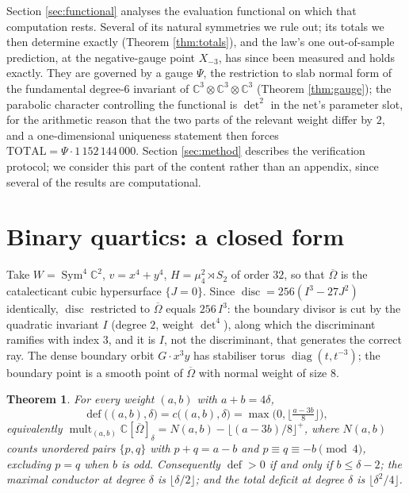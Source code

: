 \documentclass[11pt,reqno]{amsart}
\theoremstyle{plain}
\newtheorem{theorem}{Theorem}[section]
\theoremstyle{definition}
\DeclareMathOperator{\Sym}{Sym}
\DeclareMathOperator{\mult}{mult}
\DeclareMathOperator{\dfc}{def}
\newcommand{\cO}{\overline{\Omega}}
\newcommand{\bC}{\mathbb{C}}
\begin{document}
Section \ref{sec:functional} analyses the evaluation functional on which that
computation rests.  Several of its natural symmetries we rule out; its totals
we then determine exactly (Theorem \ref{thm:totals}), and the law's one
out-of-sample prediction, at the negative-gauge point $X_{-3}$, has since been
measured and holds exactly.  They are governed by a
gauge $\Psi$, the restriction to slab normal form of the fundamental degree-$6$
invariant of $\bC^{3}\otimes\bC^{3}\otimes\bC^{3}$ (Theorem \ref{thm:gauge});
the parabolic character controlling the functional is $\det^{2}$ in the net's
parameter slot, for the arithmetic reason that the two parts of the relevant
weight differ by $2$, and a one-dimensional uniqueness statement then forces
$\mathrm{TOTAL}=\Psi\cdot 1\,152\,144\,000$.  Section \ref{sec:method}
describes the verification protocol; we consider this part of the content
rather than an appendix, since several of the results are computational.

\section{Binary quartics: a closed form}\label{sec:worldA}

Take $W=\Sym^{4}\bC^{2}$, $v=x^{4}+y^{4}$, $H=\mu_4^{2}\rtimes S_2$ of order
$32$, so that $\cO$ is the catalecticant cubic hypersurface $\{J=0\}$.  Since
$\operatorname{disc}=256(I^{3}-27J^{2})$ identically, $\operatorname{disc}$
restricted to $\cO$ equals $256\,I^{3}$: the boundary divisor is cut by the
quadratic invariant $I$ (degree $2$, weight $\det^{4}$), along which the
discriminant ramifies with index $3$, and it is $I$, not the discriminant, that
generates the correct ray.  The dense boundary orbit $G\cdot x^{3}y$ has
stabiliser torus $\operatorname{diag}(t,t^{-3})$; the boundary point is a
smooth point of $\cO$ with normal weight of size $8$.

\begin{theorem}\label{thm:A}
For every weight $(a,b)$ with $a+b=4\delta$,
\[
  \dfc\big((a,b),\delta\big)=c\big((a,b),\delta\big)
   =\max\Big(0,\Big\lfloor\tfrac{a-3b}{8}\Big\rfloor\Big),
\]
equivalently
$\mult_{(a,b)}\bC[\cO]_\delta=N(a,b)-\lfloor (a-3b)/8\rfloor^{+}$, where
$N(a,b)$ counts unordered pairs $\{p,q\}$ with $p+q=a-b$ and
$p\equiv q\equiv -b \pmod 4$, excluding $p=q$ when $b$ is odd.  Consequently
$\dfc>0$ if and only if $b\le\delta-2$; the maximal conductor at degree
$\delta$ is $\lfloor\delta/2\rfloor$; and the total deficit at degree $\delta$
is $\lfloor\delta^{2}/4\rfloor$.
\end{theorem}
\end{document}
